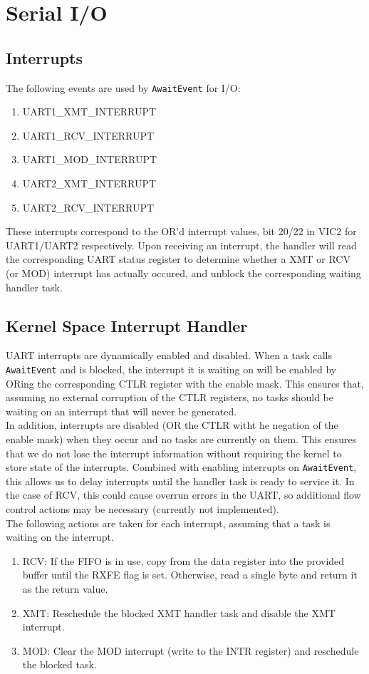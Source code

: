 \documentclass[12pt]{article}
\begin{document}
\section{Serial I/O}

\subsection{Interrupts}
The following events are used by \texttt{AwaitEvent} for I/O:
\begin{enumerate}
    \item UART1\_XMT\_INTERRUPT
    \item UART1\_RCV\_INTERRUPT
    \item UART1\_MOD\_INTERRUPT
    \item UART2\_XMT\_INTERRUPT
    \item UART2\_RCV\_INTERRUPT
\end{enumerate}

These interrupts correspond to the OR'd interrupt values, bit 20/22 in VIC2 for UART1/UART2 respectively. Upon receiving
an interrupt, the handler will read the corresponding UART status register to determine whether a XMT or RCV (or MOD)
interrupt has actually occured, and unblock the corresponding waiting handler task.

\subsection{Kernel Space Interrupt Handler}
UART interrupts are dynamically enabled and disabled. When a task calls \texttt{AwaitEvent} and is blocked, the
interrupt it is waiting on will be enabled by ORing the corresponding CTLR register with the enable mask. This ensures
that, assuming no external corruption of the CTLR registers, no tasks should be waiting on an interrupt that will never
be generated.
\\
In addition, interrupts are disabled (OR the CTLR witht he negation of the enable mask) when they occur
and no tasks are currently on them. This ensures that we do not lose the interrupt information without requiring the
kernel to store state of the interrupts. Combined with enabling interrupts on \texttt{AwaitEvent}, this allows us to
delay interrupts until the handler task is ready to service it. In the case of RCV, this could cause overrun errors in
the UART, so additional flow control actions may be necessary (currently not implemented).
\\
The following actions are taken for each interrupt, assuming that a task is waiting on the interrupt.
\begin{enumerate}
    \item RCV: If the FIFO is in use, copy from the data register into the provided buffer until the RXFE flag is set.
    Otherwise, read a single byte and return it as the return value.
    \item XMT: Reschedule the blocked XMT handler task and disable the XMT interrupt.
    \item MOD: Clear the MOD interrupt (write to the INTR register) and reschedule the blocked task.
\end{enumerate}
\end{document}
